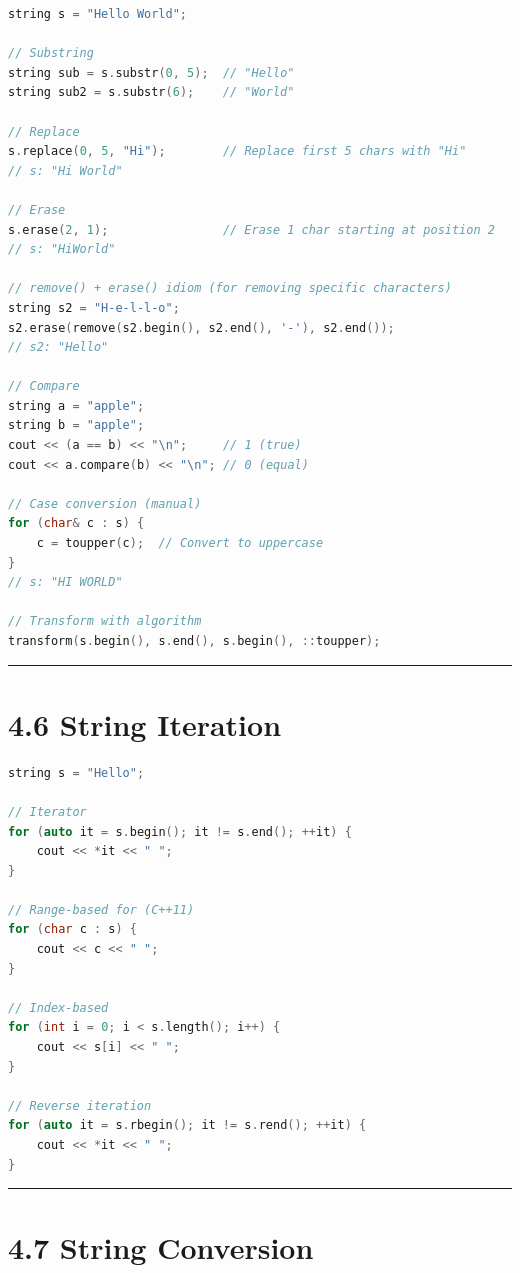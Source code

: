 \begin{lstlisting}[language={C++}]
string s = "Hello World";

// Substring
string sub = s.substr(0, 5);  // "Hello"
string sub2 = s.substr(6);    // "World"

// Replace
s.replace(0, 5, "Hi");        // Replace first 5 chars with "Hi"
// s: "Hi World"

// Erase
s.erase(2, 1);                // Erase 1 char starting at position 2
// s: "HiWorld"

// remove() + erase() idiom (for removing specific characters)
string s2 = "H-e-l-l-o";
s2.erase(remove(s2.begin(), s2.end(), '-'), s2.end());
// s2: "Hello"

// Compare
string a = "apple";
string b = "apple";
cout << (a == b) << "\n";     // 1 (true)
cout << a.compare(b) << "\n"; // 0 (equal)

// Case conversion (manual)
for (char& c : s) {
    c = toupper(c);  // Convert to uppercase
}
// s: "HI WORLD"

// Transform with algorithm
transform(s.begin(), s.end(), s.begin(), ::toupper);
\end{lstlisting}

\begin{center}\rule{0.5\linewidth}{0.5pt}\end{center}

\hypertarget{string-iteration}{%
\section{4.6 String Iteration}\label{string-iteration}}

\begin{lstlisting}[language={C++}]
string s = "Hello";

// Iterator
for (auto it = s.begin(); it != s.end(); ++it) {
    cout << *it << " ";
}

// Range-based for (C++11)
for (char c : s) {
    cout << c << " ";
}

// Index-based
for (int i = 0; i < s.length(); i++) {
    cout << s[i] << " ";
}

// Reverse iteration
for (auto it = s.rbegin(); it != s.rend(); ++it) {
    cout << *it << " ";
}
\end{lstlisting}

\begin{center}\rule{0.5\linewidth}{0.5pt}\end{center}

\hypertarget{string-conversion}{%
\section{4.7 String Conversion}\label{string-conversion}}

